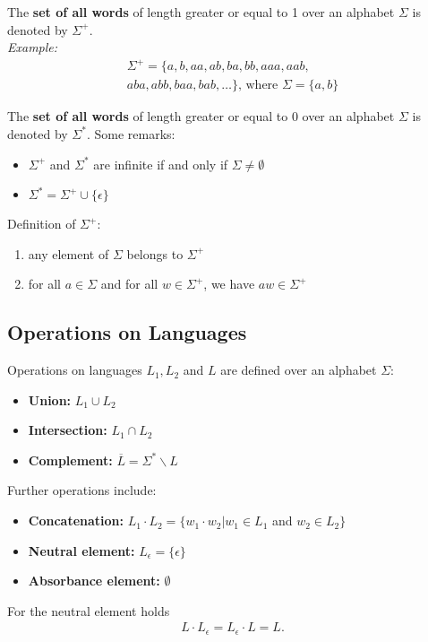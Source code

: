 The \textbf{set of all words} of length greater or equal to 1 
over an alphabet $\Sigma$ is denoted by $\Sigma^{+}$.\\

\textit{Example:}
\begin{align*}
  \Sigma^{+} = \{a,b,aa,ab,ba,bb,aaa,aab,\\aba,abb,baa,bab,\dots\} \text{, where } \Sigma = \{a,b\}
\end{align*}

The \textbf{set of all words} of length greater or equal to 
0 over an alphabet $\Sigma$ is denoted by $\Sigma^{*}$. Some remarks:
\begin{itemize}
  \item $\Sigma^{+}$ and $\Sigma^{*}$ are infinite if and only if $\Sigma \neq \emptyset$
  \item $\Sigma^{*} = \Sigma^{+} \cup \{\epsilon\}$
\end{itemize}

Definition of $\Sigma^{+}$:
\begin{enumerate}
  \item any element of $\Sigma$ belongs to $\Sigma^{+}$
  \item for all $a \in \Sigma$ and for all $w \in \Sigma^{+}$, we have $aw \in \Sigma^{+}$ 
\end{enumerate}

\subsection{Operations on Languages}
Operations on languages $L_1, L_2$ and $L$ are defined over an alphabet $\Sigma$:
\begin{itemize}
  \item \textbf{Union:} $L_1 \cup L_2$
  \item \textbf{Intersection:} $L_1 \cap L_2$
  \item \textbf{Complement:} $\overline{L} = \Sigma^{*} \backslash L$
\end{itemize}

Further operations include:
\begin{itemize}
  \item \textbf{Concatenation:} $L_1 \cdot L_2 = \{w_1 \cdot w_2 | w_1 \in L_1 $ and $w_2 \in L_2\} $
  \item \textbf{Neutral element:} $L_\epsilon = \{\epsilon\}$
  \item \textbf{Absorbance element:} $\emptyset$
\end{itemize}
For the neutral element holds
\begin{align*}
  L \cdot L_\epsilon = L_\epsilon \cdot L = L.
\end{align*}

